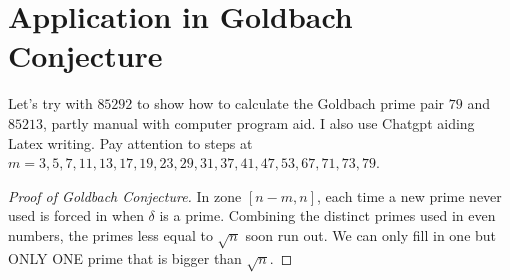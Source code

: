 \documentclass{article}
\begin{document}
\newpage
\section{Application in Goldbach Conjecture}
Let's try with $85292$ to show how to calculate the Goldbach prime pair $79$ and $85213$, partly manual with computer program aid. I also use Chatgpt aiding Latex writing. Pay attention to steps at $m=3,5,7,11,13,17,19,23,29,31,37,41,47,53,67,71,73,79$.

\begin{proof}[Proof of Goldbach Conjecture]
In zone $[n-m,n]$, each time a new prime never used is forced in when $\delta$ is a prime. Combining the distinct primes used in even numbers, the primes less equal to $\sqrt n$ soon run out. We can only fill in one but ONLY ONE prime that is bigger than $\sqrt n$.
\end{proof}
\end{document}
